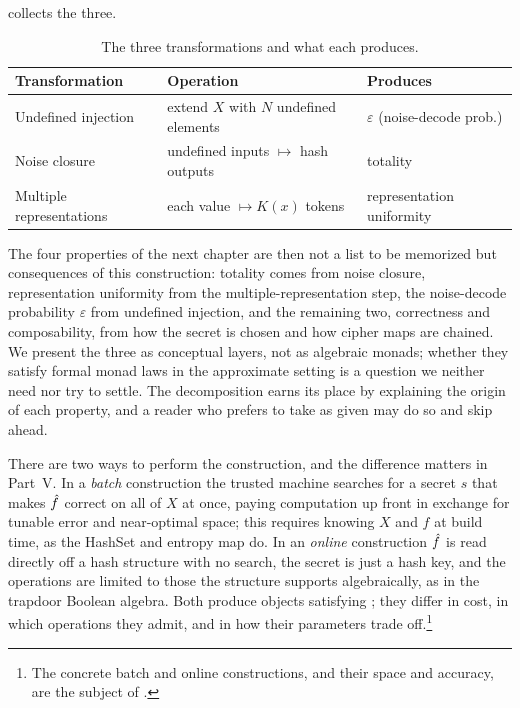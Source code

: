  collects the three.

\begin{table}[t]
\centering
\caption{The three transformations and what each produces.}
\label{tab:transformations}
\begin{tabular}{@{}lll@{}}
\toprule
Transformation & Operation & Produces \\
\midrule
Undefined injection & extend $X$ with $N$ undefined elements & $\varepsilon$ (noise-decode prob.) \\
Noise closure & undefined inputs $\mapsto$ hash outputs & totality \\
Multiple representations & each value $\mapsto K(x)$ tokens & representation uniformity \\
\bottomrule
\end{tabular}
\end{table}

The four properties of the next chapter are then not a list to be
memorized but consequences of this construction: totality comes from noise
closure, representation uniformity from the multiple-representation step,
the noise-decode probability $\varepsilon$ from undefined injection, and the
remaining two, correctness and composability, from how the secret is chosen
and how cipher maps are chained. We present the three as conceptual layers,
not as algebraic monads; whether they satisfy formal monad laws in the
approximate setting is a question we neither need nor try to settle. The
decomposition earns its place by explaining the origin of each property,
and a reader who prefers to take  as given may do so
and skip ahead.

There are two ways to perform the construction, and the difference matters
in Part~V. In a \emph{batch} construction the trusted machine searches for
a secret $s$ that makes $\hat{f}$ correct on all of $X$ at once, paying
computation up front in exchange for tunable error and near-optimal space;
this requires knowing $X$ and $f$ at build time, as the HashSet and entropy
map do. In an \emph{online} construction $\hat{f}$ is read directly off a
hash structure with no search, the secret is just a hash key, and the
operations are limited to those the structure supports algebraically, as in
the trapdoor Boolean algebra. Both produce objects satisfying
; they differ in cost, in which operations they admit,
and in how their parameters trade off.\footnote{The concrete batch and
online constructions, and their space and accuracy, are the subject of
.}

